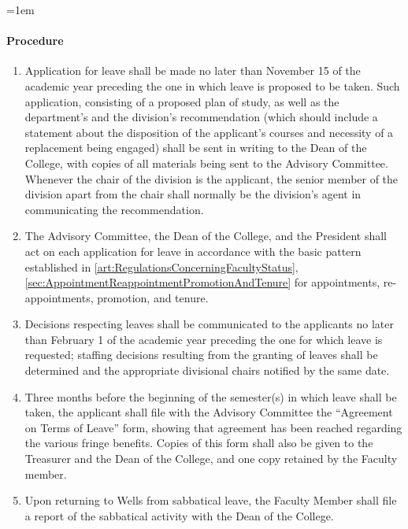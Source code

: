 \documentclass{manual}
\let\oldparagraph\paragraph
\renewcommand\paragraph{\leftskip=1em\oldparagraph}
\newcommand{\itemLevelA}{\alph*.}
\newcommand{\itemRefA}{\alph*}
\begin{document}
\paragraph{Procedure}
\begin{enumerate}[label=\itemLevelA,ref=\itemRefA]
\item Application for leave shall be made no later than November 15 of the academic year preceding the one in which leave is proposed to be taken. Such application, consisting of a proposed plan of study, as well as the department's and the division's recommendation (which should include a statement about the disposition of the applicant's courses and necessity of a replacement being engaged) shall be sent in writing to the Dean of the College, with copies of all materials being sent to the Advisory Committee. Whenever the chair of the division is the applicant, the senior member of the division apart from the chair shall normally be the division's agent in communicating the recommendation.

\item The Advisory Committee, the Dean of the College, and the President shall act on each application for leave in accordance with the basic pattern established in \cref{art:RegulationsConcerningFacultyStatus}, \cref{sec:AppointmentReappointmentPromotionAndTenure} for appointments, re-appointments, promotion, and tenure.

\item Decisions respecting leaves shall be communicated to the applicants no later than February 1 of the academic year preceding the one for which leave is requested; staffing decisions resulting from the granting of leaves shall be determined and the appropriate divisional chairs notified by the same date.

\item Three months before the beginning of the semester(s) in which leave shall be taken, the applicant shall file with the Advisory Committee the ``Agreement on Terms of Leave'' form, showing that agreement has been reached regarding the various fringe benefits. Copies of this form shall also be given to the Treasurer and the Dean of the College, and one copy retained by the Faculty member.

\item Upon returning to Wells from sabbatical leave, the Faculty Member shall file a report of the sabbatical activity with the Dean of the College.
\end{enumerate}
\end{document}

